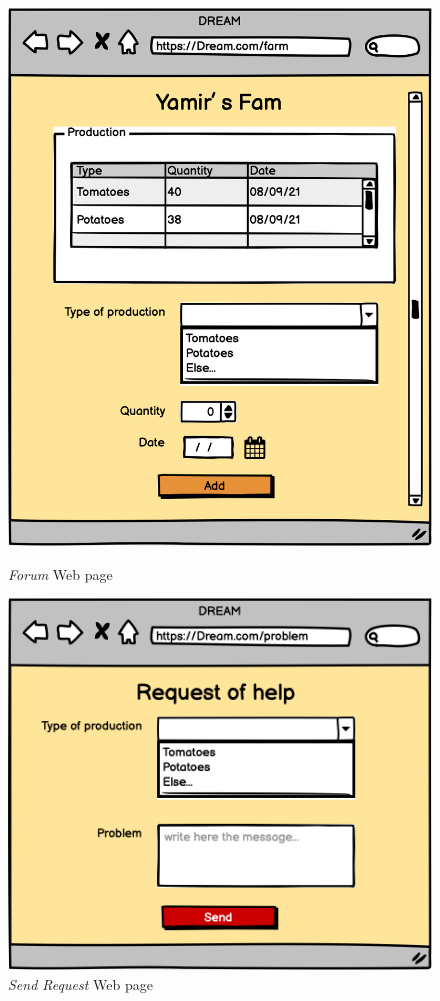\begin{figure}[H]
    \begin{minipage}{0.4\textwidth}
        \centering
        \includegraphics[width=1\textwidth]{images/mockups/FAddData.png}
        \caption{\emph{Forum} Web page}
        \label{fig:addData}
    \end{minipage}\hfill
    \begin{minipage}{0.39\textwidth}
        \centering
        \includegraphics[width=1\textwidth]{images/mockups/Help.png}
        \caption{\emph{Send Request} Web page}
        \label{fig:help}
    \end{minipage}
\end{figure}


